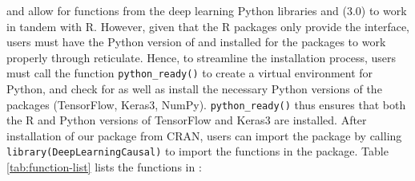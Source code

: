  and  allow for functions from the deep
learning Python libraries  and (3.0) to work
in tandem with R. However, given that the R packages only provide the
interface, users must have the Python version of  and
 installed for the packages to work properly through
reticulate. Hence, to streamline the installation process, users must
call the function \texttt{python\_ready()} to create a virtual environment for
Python, and check for as well as install the necessary Python versions
of the packages (TensorFlow, Keras3, NumPy). \texttt{python\_ready()} thus
ensures that both the R and Python versions of TensorFlow and Keras3 are
installed. After installation of our package from CRAN, users can import
the package by calling \texttt{library(DeepLearningCausal)} to import the
functions in the package. Table \ref{tab:function-list} lists the functions in
:

